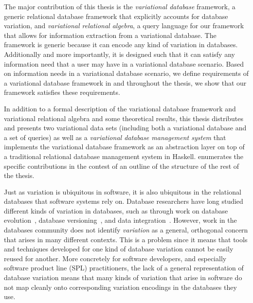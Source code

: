 The major contribution of this thesis is the \emph{variational database} framework,
a generic relational database framework that explicitly accounts for database variation,
and \emph{variational relational algebra}, a query language for our framework
that allows for information extraction from a variational database. 
The framework is generic because it can encode any kind of variation
in databases. Additionally and more importantly, it is designed such that it can satisfy
any information need that a user may have in a variational database scenario. 
Based on information needs in a variational database scenario, we define 
requirements of a variational database framework in  and throughout the
thesis, we show that our framework satisfies these requirements.

In addition to a formal description of the variational database framework and
variational relational algebra and some theoretical results,
this thesis distributes and presents two variational data sets (including both a variational
database and a set of queries) as well as a \emph{variational database management system}
that implements the variational database framework as an abstraction layer on top of a 
traditional relational database management system in Haskell.
 enumerates the specific contributions in the contest of an outline
of the structure of the rest of the thesis. 

Just as variation is ubiquitous in software, it is also ubiquitous in the
relational databases that software systems rely on.
%
Database researchers have long studied different kinds of variation in
databases, such as through work on database
evolution~\cite{schVersioning97Castro,SchEvolRA90McKenzie,prima08Moon},
database versioning~\cite{datasetVersioning,dbVersioning}, and data
integration~\cite{dataIntegBook}.
%
However, work in the databases community does not identify \emph{variation} as
a general, orthogonal concern that arises in many different contexts.
%
This is a problem since it means that tools and techniques developed for one
kind of database variation cannot be easily reused for another. More concretely
for software developers, and especially software product line (SPL)
practitioners, the lack of a general representation of database variation means
that many kinds of variation that arise in software do not map cleanly onto
corresponding variation encodings in the databases they use.



